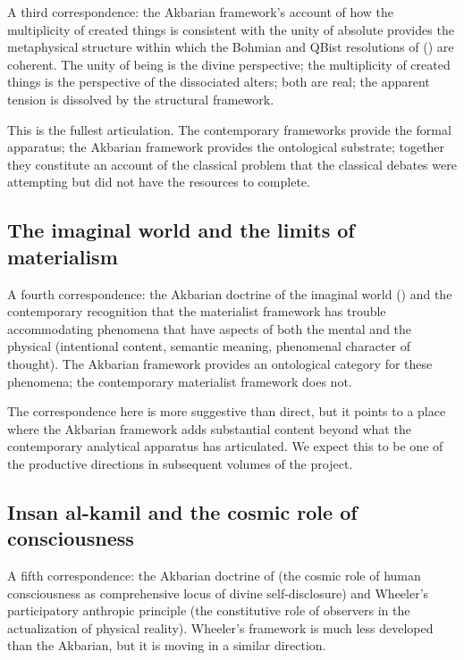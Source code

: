 A third correspondence: the Akbarian framework's account of how the
multiplicity of created things is consistent with the unity of
absolute  provides the metaphysical structure within
which the Bohmian and QBist resolutions of 
() are coherent. The unity of being
is the divine perspective; the multiplicity of created things is
the perspective of the dissociated alters; both are real; the
apparent tension is dissolved by the structural framework.

This is the fullest articulation. The contemporary frameworks
provide the formal apparatus; the Akbarian framework provides the
ontological substrate; together they constitute an account of the
classical  problem that the classical 
debates were attempting but did not have the resources to complete.

\subsection{The imaginal world and the limits of materialism}

A fourth correspondence: the Akbarian doctrine of the imaginal
world () and the contemporary recognition that
the materialist framework has trouble accommodating phenomena that
have aspects of both the mental and the physical (intentional
content, semantic meaning, phenomenal character of thought). The
Akbarian framework provides an ontological category for these
phenomena; the contemporary materialist framework does not.

The correspondence here is more suggestive than direct, but it
points to a place where the Akbarian framework adds substantial
content beyond what the contemporary analytical apparatus has
articulated. We expect this to be one of the productive directions
in subsequent volumes of the project.

\subsection{Insan al-kamil and the cosmic role of consciousness}

A fifth correspondence: the Akbarian doctrine of 
(the cosmic role of human consciousness as comprehensive locus of
divine self-disclosure) and Wheeler's participatory anthropic
principle (the constitutive role of observers in the actualization
of physical reality). Wheeler's framework is much less developed
than the Akbarian, but it is moving in a similar direction.

